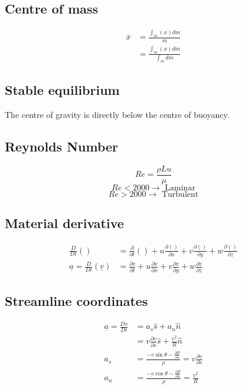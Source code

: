 \documentclass[class=report, crop=false, 12pt,a4paper]{standalone}
\begin{document}
\subsection{Centre of mass}
\begin{align*}
  \bar{x} &= \frac{\int_m (x) dm}{m}\\
  &= \frac{\int_m (x)dm}{\int_m dm}
\end{align*}
\subsection{Stable equilibrium}
The centre of gravity is directly below the centre of buoyancy.
\subsection{Reynolds Number}
\begin{equation*}
  Re = \frac{\rho L u}{\mu}
\end{equation*}
\[ Re < 2000 \rightarrow \textrm{ Laminar} \]
\[ Re > 2000 \rightarrow \textrm{ Turbulent} \]
\subsection{Material derivative}
\begin{align*}
  \frac{D}{Dt}() &= \frac{\partial}{\partial t}() + u \frac{\partial()}{\partial x} + v \frac{\partial ()}{\partial y} + w\frac{\partial ()}{\partial z}\\
  \underline{a} = \frac{D}{Dt}(\underline{v}) &= \frac{\partial v}{\partial t} + u\frac{\partial v}{\partial x} + v\frac{\partial v}{\partial y} + w \frac{\partial v}{\partial z} 
\end{align*}
\subsection{Streamline coordinates}
\begin{align*}
  \underline{a} = \frac{Dv}{Dt} &= a_s\hat{s} + a_n\hat{n}\\
  &= v\frac{\partial v}{\partial s} \hat{s} + \frac{v^2}{R} \hat{n}\\
  a_s &= \frac{-v\sin \theta - \frac{\partial P}{\partial s}}{\rho} = v\frac{\partial v}{\partial s}\\
  a_n &= \frac{-v\cos \theta -\frac{\partial P}{\partial n}}{\rho} = \frac{v^2}{R}
\end{align*}
\end{document}
